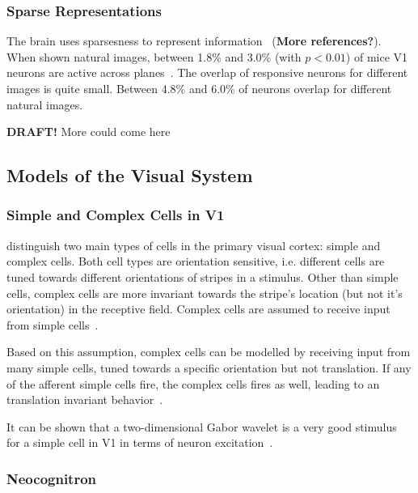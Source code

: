 \subsubsection{Sparse Representations}\label{subsubsec:sparse_representations}

The brain uses sparsesness to represent information~\citep{yoshida2020natural} (\textbf{More references?}).
When shown natural images, between 1.8\% and 3.0\% (with $p < 0.01$) of mice \ac{V1} neurons are active across planes~\citep{yoshida2020natural}.
The overlap of responsive neurons for different images is quite small.
Between 4.8\% and 6.0\% of neurons overlap for different natural images.

\textbf{DRAFT!} More could come here

\subsection{Models of the Visual System}

\subsubsection{Simple and Complex Cells in \ac{V1}}\label{subsubseq:simple_complex_cells}

\citet{hubel1962receptive} distinguish two main types of cells in the primary visual cortex: simple and complex cells.
Both cell types are orientation sensitive, i.e. different cells are tuned towards different orientations of stripes in a stimulus.
Other than simple cells, complex cells are more invariant towards the stripe's location (but not it's orientation) in the receptive field.
Complex cells are assumed to receive input from simple cells~\citep{hubel1962receptive}.

Based on this assumption, complex cells can be modelled by receiving input from many simple cells, tuned towards a specific orientation but not translation.
If any of the afferent simple cells fire, the complex cells fires as well, leading to an translation invariant behavior~\citep{hubel1962receptive}.

It can be shown that a two-dimensional Gabor wavelet is a very good stimulus for a simple cell in \ac{V1} in terms of neuron excitation~\citep{jones1987evaluation}.

\subsubsection{Neocognitron}

